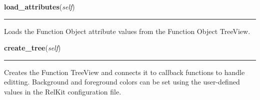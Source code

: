     \label{reliafree:function:Function:load_attributes}

    \vspace{0.5ex}

\hspace{.8\funcindent}\begin{boxedminipage}{\funcwidth}

    \raggedright \textbf{load\_attributes}(\textit{self})

    \vspace{-1.5ex}

    \rule{\textwidth}{0.5\fboxrule}
\setlength{\parskip}{2ex}
    Loads the Function Object attribute values from the Function Object 
    TreeView.

\setlength{\parskip}{1ex}
    \end{boxedminipage}

    \label{reliafree:function:Function:create_tree}

    \vspace{0.5ex}

\hspace{.8\funcindent}\begin{boxedminipage}{\funcwidth}

    \raggedright \textbf{create\_tree}(\textit{self})

    \vspace{-1.5ex}

    \rule{\textwidth}{0.5\fboxrule}
\setlength{\parskip}{2ex}
    Creates the Function TreeView and connects it to callback functions to 
    handle editting.  Background and foreground colors can be set using the
    user-defined values in the RelKit configuration file.

\setlength{\parskip}{1ex}
    \end{boxedminipage}

    \label{reliafree:function:Function:load_tree}

    \vspace{0.5ex}

